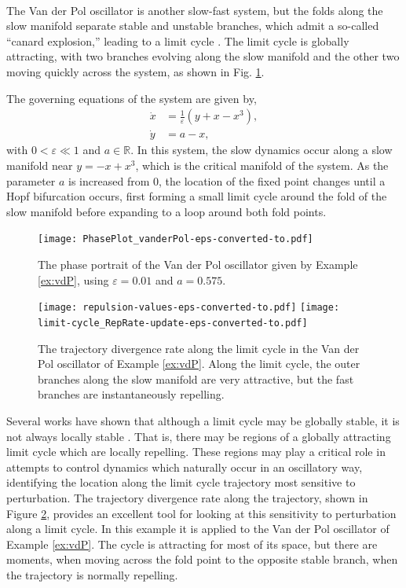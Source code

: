 \documentclass[twocolumn]{svjour3}
\begin{document}
 \\
The Van der Pol oscillator is another slow-fast system, but the folds along the slow manifold separate stable and unstable branches, which admit a so-called ``canard explosion,'' leading to a limit cycle \cite{krupa2001relaxation,kuehn2016multiple}. The limit cycle is globally attracting, with two branches evolving along the slow manifold and the other two moving quickly across the system, as shown in Fig. \ref{fig:phaseplot-vdP}.

The governing equations of the system are given by,
\begin{equation}
\begin{aligned}
\dot{x} & = \frac{1}{\varepsilon} \left(y + x - x^3\right), \\
\dot{y} & = a - x,
\end{aligned}
\label{eq: vanderPol}
\end{equation}
with $0<\varepsilon\ll1$ and $a\in\mathbb{R}$. In this system, the slow dynamics occur along a slow manifold near $y=-x+x^3$, which is the critical manifold of the system. As the parameter $a$ is increased from $0$, the location of the fixed point changes until a Hopf bifurcation occurs, first forming a small limit cycle around the fold of the slow manifold before expanding to a loop around both fold points.

\begin{figure}
\centering
\texttt{[image: PhasePlot\_vanderPol-eps-converted-to.pdf]}
\caption{The phase portrait of the Van der Pol oscillator given by Example \ref{ex:vdP}, using $\varepsilon = 0.01$ and $a = 0.575$.}
\label{fig:phaseplot-vdP}
\end{figure}

\begin{figure}
\centering
\texttt{[image: repulsion-values-eps-converted-to.pdf]}
\texttt{[image: limit-cycle\_RepRate-update-eps-converted-to.pdf]}
\caption{The trajectory divergence rate along the limit cycle in the Van der Pol oscillator of Example \ref{ex:vdP}. Along the limit cycle, the outer branches along the slow manifold are very attractive, but the fast branches are instantaneously repelling.}
\label{fig:limitcycle}
\end{figure}

Several works have shown that although a limit cycle may be globally stable, it is not always locally stable \cite{ali1999local,norris2008revisiting}. That is, there may be regions of a globally attracting limit cycle which are locally repelling. These regions may play a critical role in attempts to control dynamics which naturally occur in an oscillatory way, identifying the location along the limit cycle trajectory most sensitive to perturbation. The trajectory divergence rate along the trajectory, shown in Figure \ref{fig:limitcycle}, provides an excellent tool for looking at this sensitivity to perturbation along a limit cycle. In this example it is applied to the Van der Pol oscillator of Example \ref{ex:vdP}. The cycle is attracting for most of its space, but there are moments, when moving across the fold point to the opposite stable branch, when the trajectory is normally repelling.
\end{document}
